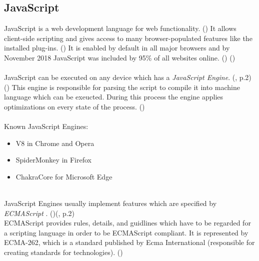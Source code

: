 \subsection{JavaScript}\label{JS}
JavaScript is a web development language for web functionality. (\textcite{wood}) It allows client-side scripting and gives access to many browser-populated features like the installed plug-ins. (\textcite{amiunique}) It is enabled by default in all major browsers and by November 2018 JavaScript was included by 95\% of all websites online. (\textcite{jsinfo}) (\textcite{w3techs18})\\\\
JavaScript can be executed on any device which has a \textit{JavaScript Engine}. (\textcite{mulazzani13}, p.2) (\textcite{jsinfo}) This engine is responsible for parsing the script to compile it into machine language which can be exeucted. During this process the engine applies optimizations on every state of the process. (\textcite{jsinfo})\\\\
Known JavaScript Engines:
\begin{itemize}
	\item V8 in Chrome and Opera
	\item SpiderMonkey in Firefox
	\item ChakraCore for Microsoft Edge\\\\
\end{itemize}
JavaScript Engines usually implement features which are specified by \textit{ECMAScript} .  (\textcite{jsinfo})(\textcite{mulazzani13}, p.2)\\
ECMAScript provides rules, details, and guidlines which have to be regarded for a scripting language in order to be ECMAScript compliant. It is represented by ECMA-262, which is a standard published by Ecma International (responsible for creating standards for technologies). (\textcite{aranda17})\\\\
